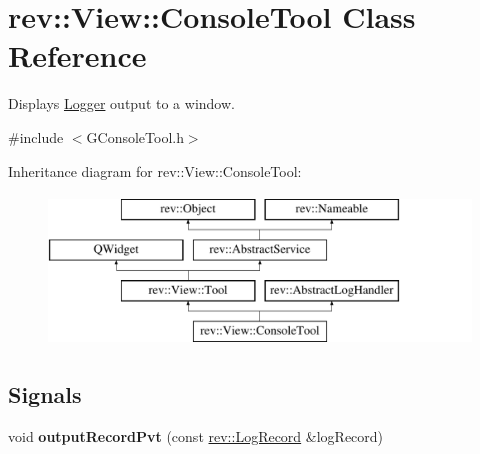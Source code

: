 \hypertarget{classrev_1_1_view_1_1_console_tool}{}\section{rev\+::View\+::Console\+Tool Class Reference}
\label{classrev_1_1_view_1_1_console_tool}


Displays \mbox{\hyperlink{classrev_1_1_logger}{Logger}} output to a window.  




{\ttfamily \#include $<$G\+Console\+Tool.\+h$>$}

Inheritance diagram for rev\+::View\+::Console\+Tool\+:\begin{figure}[H]
\begin{center}
\leavevmode
\includegraphics[height=4.000000cm]{classrev_1_1_view_1_1_console_tool}
\end{center}
\end{figure}
\subsection*{Signals}
\begin{DoxyCompactItemize}
\item 
\mbox{\label{classrev_1_1_view_1_1_console_tool_a52b2ce06ea793041a71f135a4f28ae31}} 
void {\bfseries output\+Record\+Pvt} (const \mbox{\hyperlink{classrev_1_1_log_record}{rev\+::\+Log\+Record}} \&log\+Record)
\end{DoxyCompactItemize}
